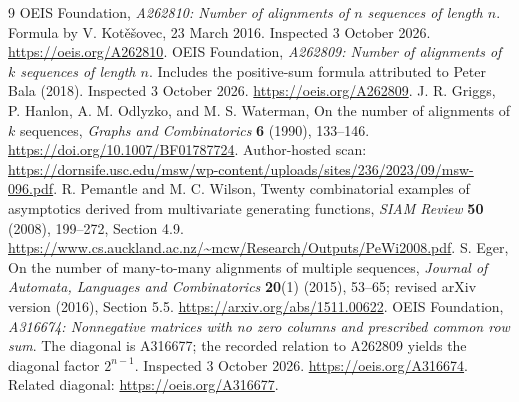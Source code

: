 \documentclass[11pt,letterpaper]{article}
\theoremstyle{remark}\newtheorem{remark}[theorem]{Remark}
\begin{document}
\begin{thebibliography}{9}
 OEIS Foundation, \emph{A262810: Number of alignments of $n$ sequences of length $n$}. Formula by V. Kot\v{e}\v{s}ovec, 23 March 2016. Inspected 3 October 2026. \url{https://oeis.org/A262810}.
 OEIS Foundation, \emph{A262809: Number of alignments of $k$ sequences of length $n$}. Includes the positive-sum formula attributed to Peter Bala (2018). Inspected 3 October 2026. \url{https://oeis.org/A262809}.
 J. R. Griggs, P. Hanlon, A. M. Odlyzko, and M. S. Waterman, On the number of alignments of $k$ sequences, \emph{Graphs and Combinatorics} \textbf{6} (1990), 133--146. \url{https://doi.org/10.1007/BF01787724}. Author-hosted scan: \url{https://dornsife.usc.edu/msw/wp-content/uploads/sites/236/2023/09/msw-096.pdf}.
 R. Pemantle and M. C. Wilson, Twenty combinatorial examples of asymptotics derived from multivariate generating functions, \emph{SIAM Review} \textbf{50} (2008), 199--272, Section 4.9. \url{https://www.cs.auckland.ac.nz/~mcw/Research/Outputs/PeWi2008.pdf}.
 S. Eger, On the number of many-to-many alignments of multiple sequences, \emph{Journal of Automata, Languages and Combinatorics} \textbf{20}(1) (2015), 53--65; revised arXiv version (2016), Section 5.5. \url{https://arxiv.org/abs/1511.00622}.
 OEIS Foundation, \emph{A316674: Nonnegative matrices with no zero columns and prescribed common row sum}. The diagonal is A316677; the recorded relation to A262809 yields the diagonal factor $2^{n-1}$. Inspected 3 October 2026. \url{https://oeis.org/A316674}. Related diagonal: \url{https://oeis.org/A316677}.
\end{thebibliography}
\end{document}
